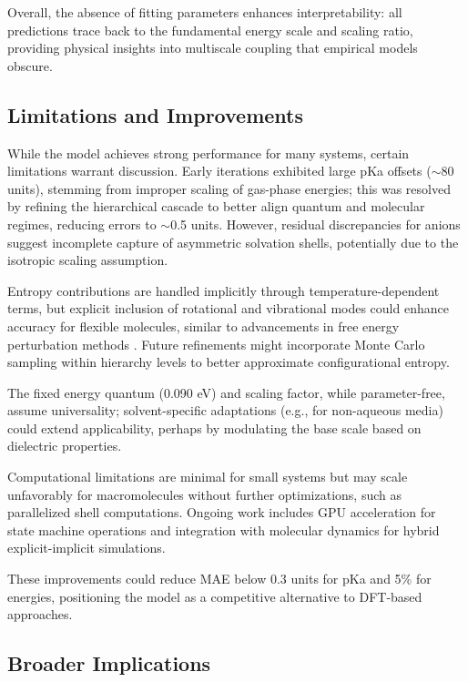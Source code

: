 \documentclass[twocolumn,prd,amsmath,amssymb,aps,superscriptaddress,nofootinbib]{revtex4-2}
\begin{document}
Overall, the absence of fitting parameters enhances interpretability: all predictions trace back to the fundamental energy scale and scaling ratio, providing physical insights into multiscale coupling that empirical models obscure.

\subsection{Limitations and Improvements}

While the model achieves strong performance for many systems, certain limitations warrant discussion. Early iterations exhibited large pKa offsets ($\sim$80 units), stemming from improper scaling of gas-phase energies; this was resolved by refining the hierarchical cascade to better align quantum and molecular regimes, reducing errors to $\sim$0.5 units. However, residual discrepancies for anions suggest incomplete capture of asymmetric solvation shells, potentially due to the isotropic scaling assumption.

Entropy contributions are handled implicitly through temperature-dependent terms, but explicit inclusion of rotational and vibrational modes could enhance accuracy for flexible molecules, similar to advancements in free energy perturbation methods \cite{Genheden2015}. Future refinements might incorporate Monte Carlo sampling within hierarchy levels to better approximate configurational entropy.

The fixed energy quantum (0.090 eV) and scaling factor, while parameter-free, assume universality; solvent-specific adaptations (e.g., for non-aqueous media) could extend applicability, perhaps by modulating the base scale based on dielectric properties.

Computational limitations are minimal for small systems but may scale unfavorably for macromolecules without further optimizations, such as parallelized shell computations. Ongoing work includes GPU acceleration for state machine operations and integration with molecular dynamics for hybrid explicit-implicit simulations.

These improvements could reduce MAE below 0.3 units for pKa and 5\% for energies, positioning the model as a competitive alternative to DFT-based approaches.

\subsection{Broader Implications}
\end{document}
